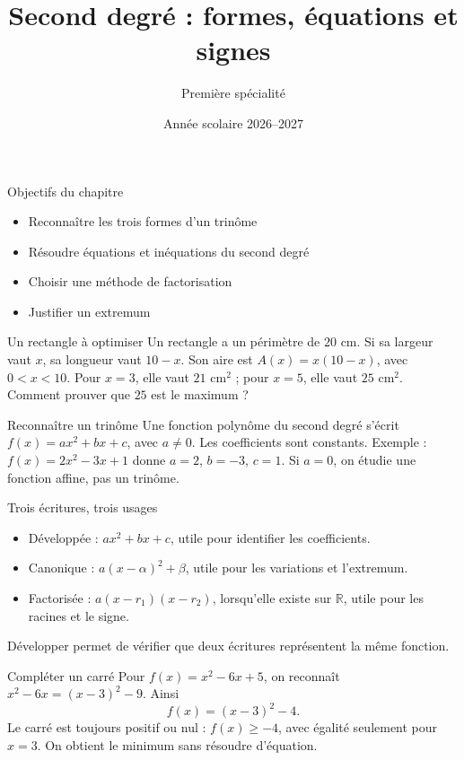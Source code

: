 \documentclass[aspectratio=169,12pt]{beamer}
\title{Second degré : formes, équations et signes}
\subtitle{Première spécialité}
\date{Année scolaire 2026--2027}
\begin{document}
\begin{frame}\titlepage\end{frame}
\begin{frame}{Objectifs du chapitre}\begin{itemize}
\item Reconnaître les trois formes d’un trinôme
\item Résoudre équations et inéquations du second degré
\item Choisir une méthode de factorisation
\item Justifier un extremum
\end{itemize}\end{frame}
\renewcommand{\slidekind}{COMPRENDRE}
\begin{frame}[t,fragile]{Un rectangle à optimiser}
Un rectangle a un périmètre de $20$ cm. Si sa largeur vaut $x$, sa longueur vaut $10-x$. Son aire est $A(x)=x(10-x)$, avec $0<x<10$. Pour $x=3$, elle vaut $21$ cm$^2$ ; pour $x=5$, elle vaut $25$ cm$^2$. Comment prouver que $25$ est le maximum ?
\end{frame}
\renewcommand{\slidekind}{COMPRENDRE}
\begin{frame}[t,fragile]{Reconnaître un trinôme}
Une fonction polynôme du second degré s’écrit $f(x)=ax^2+bx+c$, avec $a\ne0$. Les coefficients sont constants. Exemple : $f(x)=2x^2-3x+1$ donne $a=2$, $b=-3$, $c=1$. Si $a=0$, on étudie une fonction affine, pas un trinôme.
\end{frame}
\renewcommand{\slidekind}{COMPRENDRE}
\begin{frame}[t,fragile]{Trois écritures, trois usages}
\begin{itemize}\item Développée : $ax^2+bx+c$, utile pour identifier les coefficients.\item Canonique : $a(x-\alpha)^2+\beta$, utile pour les variations et l’extremum.\item Factorisée : $a(x-r_1)(x-r_2)$, lorsqu’elle existe sur $\mathbb R$, utile pour les racines et le signe.\end{itemize} Développer permet de vérifier que deux écritures représentent la même fonction.
\end{frame}
\renewcommand{\slidekind}{COMPRENDRE}
\begin{frame}[t,fragile]{Compléter un carré}
Pour $f(x)=x^2-6x+5$, on reconnaît $x^2-6x=(x-3)^2-9$. Ainsi \[f(x)=(x-3)^2-4.\] Le carré est toujours positif ou nul : $f(x)\ge-4$, avec égalité seulement pour $x=3$. On obtient le minimum sans résoudre d’équation.
\end{frame}
\end{document}
